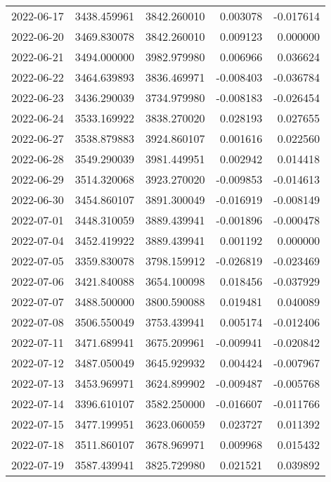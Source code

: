 \begin{tabular}{lrrrr}
2022-06-17 & 3438.459961 & 3842.260010 &        0.003078 &    -0.017614 \\
2022-06-20 & 3469.830078 & 3842.260010 &        0.009123 &     0.000000 \\
2022-06-21 & 3494.000000 & 3982.979980 &        0.006966 &     0.036624 \\
2022-06-22 & 3464.639893 & 3836.469971 &       -0.008403 &    -0.036784 \\
2022-06-23 & 3436.290039 & 3734.979980 &       -0.008183 &    -0.026454 \\
2022-06-24 & 3533.169922 & 3838.270020 &        0.028193 &     0.027655 \\
2022-06-27 & 3538.879883 & 3924.860107 &        0.001616 &     0.022560 \\
2022-06-28 & 3549.290039 & 3981.449951 &        0.002942 &     0.014418 \\
2022-06-29 & 3514.320068 & 3923.270020 &       -0.009853 &    -0.014613 \\
2022-06-30 & 3454.860107 & 3891.300049 &       -0.016919 &    -0.008149 \\
2022-07-01 & 3448.310059 & 3889.439941 &       -0.001896 &    -0.000478 \\
2022-07-04 & 3452.419922 & 3889.439941 &        0.001192 &     0.000000 \\
2022-07-05 & 3359.830078 & 3798.159912 &       -0.026819 &    -0.023469 \\
2022-07-06 & 3421.840088 & 3654.100098 &        0.018456 &    -0.037929 \\
2022-07-07 & 3488.500000 & 3800.590088 &        0.019481 &     0.040089 \\
2022-07-08 & 3506.550049 & 3753.439941 &        0.005174 &    -0.012406 \\
2022-07-11 & 3471.689941 & 3675.209961 &       -0.009941 &    -0.020842 \\
2022-07-12 & 3487.050049 & 3645.929932 &        0.004424 &    -0.007967 \\
2022-07-13 & 3453.969971 & 3624.899902 &       -0.009487 &    -0.005768 \\
2022-07-14 & 3396.610107 & 3582.250000 &       -0.016607 &    -0.011766 \\
2022-07-15 & 3477.199951 & 3623.060059 &        0.023727 &     0.011392 \\
2022-07-18 & 3511.860107 & 3678.969971 &        0.009968 &     0.015432 \\
2022-07-19 & 3587.439941 & 3825.729980 &        0.021521 &     0.039892 \\

\end{tabular}

